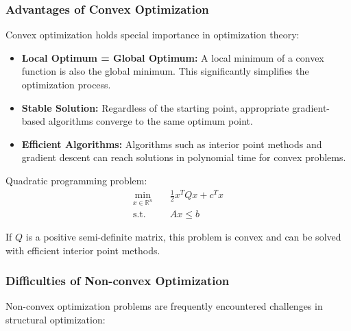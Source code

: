\subsubsection{Advantages of Convex Optimization}
Convex optimization holds special importance in optimization theory:

\begin{itemize}
    \item \textbf{Local Optimum = Global Optimum:} A local minimum of a convex function is also the global minimum. This significantly simplifies the optimization process.
    \item \textbf{Stable Solution:} Regardless of the starting point, appropriate gradient-based algorithms converge to the same optimum point.
    \item \textbf{Efficient Algorithms:} Algorithms such as interior point methods and gradient descent can reach solutions in polynomial time for convex problems.
\end{itemize}

\begin{tcolorbox}[title=Example of Convex Optimization]
Quadratic programming problem:
\begin{equation}
\begin{aligned}
\min_{x \in \mathbb{R}^n} & \quad \frac{1}{2}x^TQx + c^Tx \\
\text{s.t.} & \quad Ax \leq b
\end{aligned}
\end{equation}

If $Q$ is a positive semi-definite matrix, this problem is convex and can be solved with efficient interior point methods.
\end{tcolorbox}

\subsubsection{Difficulties of Non-convex Optimization}
Non-convex optimization problems are frequently encountered challenges in structural optimization:

